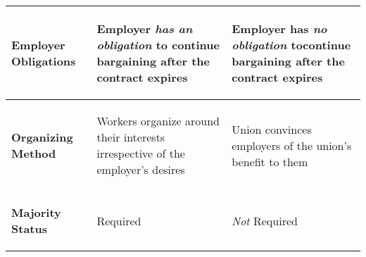 \documentclass[12pt]{article}
\begin{document}
\begin{landscape}
\begin{table}
\begin{tabular}{|p{30mm}|p{87mm}|p{87mm}|}
\begin{center}\textbf{Employer Obligations}\end{center} & %
\begin{center}\begin{flushleft}Employer \textit{has an obligation} to continue bargaining after the contract expires\end{flushleft}\end{center} & %
\begin{center}\begin{flushleft}Employer has \textit{no obligation} tocontinue bargaining after the contract expires\end{flushleft}\end{center} \\	%
\hline

\begin{center}\textbf{Organizing Method}\end{center} &	%
\begin{center}\begin{flushleft}Workers organize around their interests irrespective of the employer's desires \end{flushleft}\end{center} & %
\begin{center}\begin{flushleft}Union convinces employers of the union's benefit to them\end{flushleft}\end{center} \\	%
\hline

\begin{center} \textbf{Majority Status} \end{center} &	%
\begin{center}\begin{flushleft} Required \end{flushleft}\end{center} &	%
\begin{center}\begin{flushleft} \textit{Not} Required \end{flushleft}\end{center} \\ %
\hline





\end{tabular}
\end{table}
\end{landscape}
\end{document}
